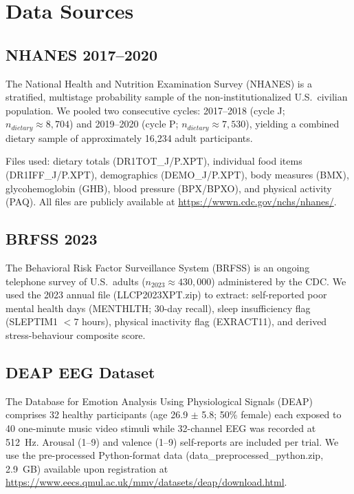 \documentclass[journal]{IEEEtran}
\begin{document}
\section{Data Sources}
\label{sec:data}

\subsection{NHANES 2017--2020}

The National Health and Nutrition Examination Survey (NHANES) is a stratified,
multistage probability sample of the non-institutionalized U.S.\ civilian
population. We pooled two consecutive cycles: 2017--2018 (cycle J; $n_{dietary}
\approx 8{,}704$) and 2019--2020 (cycle P; $n_{dietary} \approx 7{,}530$), yielding
a combined dietary sample of approximately 16{,}234 adult participants.

Files used: dietary totals (DR1TOT\_J/P.XPT), individual food items
(DR1IFF\_J/P.XPT), demographics (DEMO\_J/P.XPT), body measures (BMX),
glycohemoglobin (GHB), blood pressure (BPX/BPXO), and physical activity (PAQ).
All files are publicly available at
\url{https://wwwn.cdc.gov/nchs/nhanes/}.

\subsection{BRFSS 2023}

The Behavioral Risk Factor Surveillance System (BRFSS) is an ongoing telephone
survey of U.S.\ adults ($n_{2023} \approx 430{,}000$) administered by the CDC.
We used the 2023 annual file (LLCP2023XPT.zip) \cite{cdc2023brfss} to extract:
self-reported poor mental health days (MENTHLTH; 30-day recall), sleep
insufficiency flag (SLEPTIM1 $< 7$ hours), physical inactivity flag (EXRACT11),
and derived stress-behaviour composite score.

\subsection{DEAP EEG Dataset}

The Database for Emotion Analysis Using Physiological Signals (DEAP)
\cite{koelstra2012} comprises 32 healthy participants (age 26.9 $\pm$ 5.8;
50\% female) each exposed to 40 one-minute music video stimuli while 32-channel
EEG was recorded at 512~Hz. Arousal (1--9) and valence (1--9) self-reports are
included per trial. We use the pre-processed Python-format data
(data\_preprocessed\_python.zip, 2.9~GB) available upon registration at
\url{https://www.eecs.qmul.ac.uk/mmv/datasets/deap/download.html}.
\end{document}
